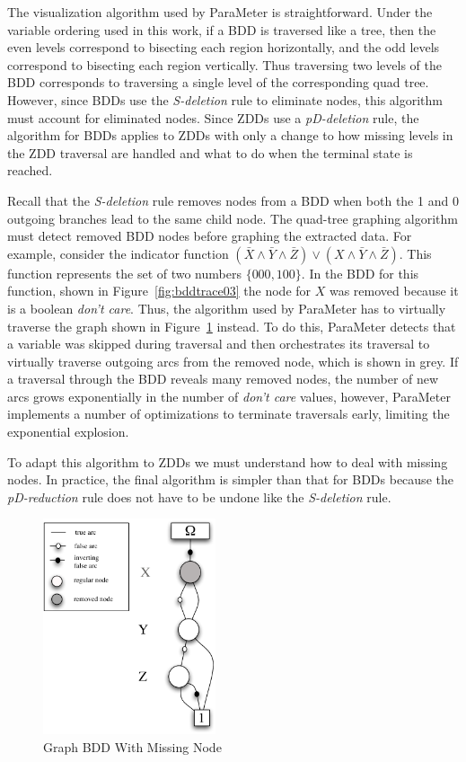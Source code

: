 \documentclass[defaultstyle,11pt]{thesis}
\begin{document}
The visualization algorithm used by ParaMeter is straightforward.
Under the variable ordering used in this work, if a BDD is traversed
like a tree, then the even levels correspond to bisecting each region
horizontally, and the odd levels correspond to bisecting each region
vertically.  Thus traversing two levels of the BDD corresponds to
traversing a single level of the corresponding quad tree.  However,
since BDDs use the \textit{S-deletion} rule to eliminate nodes, this
algorithm must account for eliminated nodes.  Since ZDDs use a
\textit{pD-deletion} rule, the algorithm for BDDs applies to
ZDDs with only a change to how missing levels in the ZDD traversal are
handled and what to do when the terminal state is reached.

Recall that the \textit{S-deletion} rule removes nodes from a BDD when
both the 1 and 0 outgoing branches lead to the same child node.  The
quad-tree graphing algorithm must detect removed BDD nodes before
graphing the extracted data.  For example, consider the indicator
function
$(\bar{X}\land\bar{Y}\land\bar{Z})\lor(X\land\bar{Y}\land\bar{Z})$.
This function represents the set of two numbers $\{000, 100\}$.  In the
BDD for this function, shown in Figure~\ref{fig:bddtrace03} the node
for $X$ was removed because it is a boolean \textit{don't care}.
Thus, the algorithm used by ParaMeter has to virtually traverse the
graph shown in Figure~\ref{fig:bddGraph} instead.  To do this,
ParaMeter detects that a variable was skipped during traversal and
then orchestrates its traversal to virtually traverse outgoing arcs
from the removed node, which is shown in grey.  If a traversal through
the BDD reveals many removed nodes, the number of new arcs grows
exponentially in the number of \textit{don't care} values, however,
ParaMeter implements a number of optimizations to terminate traversals
early, limiting the exponential explosion.

To adapt this algorithm to ZDDs we must understand how to deal with
missing nodes.  In practice, the final algorithm is simpler than that for BDDs
because the \textit{pD-reduction} rule does not have to be undone like
the \textit{S-deletion} rule.

\begin{figure}
\begin{center}
\includegraphics[height=2.5in]{figures/bddgraphEx1}
\end{center}
\caption{Graph BDD With Missing Node}
\label{fig:bddGraph}
\end{figure}
\end{document}

